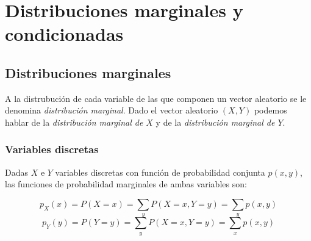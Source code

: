 \section{Distribuciones marginales y condicionadas}


\subsection{Distribuciones marginales}

A la distrubución de cada variable de las que componen un vector aleatorio se le denomina \textit{distribución marginal}.
Dado el vector aleatorio $(X, Y)$ podemos hablar de la \textit{distribución marginal de $X$} y de la \textit{distribución marginal de $Y$}. \\
\subsubsection{Variables discretas} 
Dadas $X$ e $Y$ variables discretas con función de probabilidad conjunta $p(x, y)$, las funciones de probabilidad 
marginales de ambas variables son:

\[ p_{X}(x) = P(X = x) = \sum_{y}P(X = x, Y = y) = \sum_{y}p(x, y) \]
\[ p_{Y}(y) = P(Y = y) = \sum_{y}P(X = x, Y = y) = \sum_{x}p(x, y) \] 

